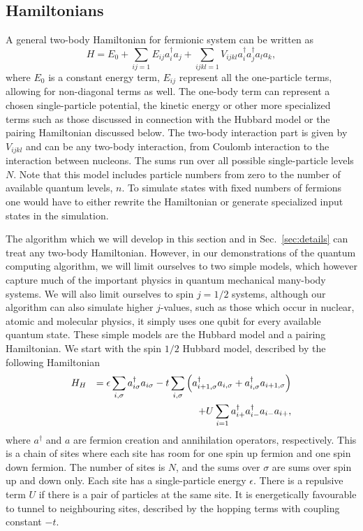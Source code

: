 \subsection{Hamiltonians}
A general two-body Hamiltonian for fermionic system 
can be written as 
\begin{equation}
\label{eq:twobodyH}
H = E_0 + \sum_{ij=1} E_{ij} a^\dag_i a_j
+\sum_{ijkl = 1} V_{ijkl} a^\dag_i a^\dag_j a_l a_k,
\end{equation} 
where $E_0$ is a constant energy term, $E_{ij}$ represent all the
one-particle terms, allowing for non-diagonal terms as well. The
one-body term can represent 
a chosen single-particle potential, the kinetic energy or other more
specialized terms such as  
those discussed in connection with the Hubbard model
\cite{hubbardmodel} or the pairing Hamiltonian  
discussed below.
The two-body interaction part is given by $V_{ijkl}$ and can be any
two-body interaction, from 
Coulomb interaction to the interaction between nucleons.  
The sums run over all possible single-particle levels $N$. 
Note that
this model includes particle numbers from zero to the number of
available quantum levels, $n$. To simulate states with fixed numbers
of fermions one would have to either rewrite the Hamiltonian or
generate specialized input states in the simulation.

The algorithm which we will develop in this section and in
Sec.~\ref{sec:details} can treat any 
two-body Hamiltonian. However, 
in our demonstrations of the quantum computing algorithm, we will limit ourselves to
two simple models, which however capture much of the important physics
in quantum mechanical 
many-body systems. We will also limit ourselves to spin $j=1/2$
systems, although our algorithm 
can also simulate  higher $j$-values, such as those which occur in nuclear, atomic and
molecular physics, it simply uses one qubit for every available
quantum state.   
These simple models are the Hubbard model and a pairing
Hamiltonian.
We start with the spin $1/2$ Hubbard model, described by the following Hamiltonian
\begin{eqnarray}
H_H &&= \epsilon \sum_{i, \sigma} a_{i\sigma}^\dag a_{i\sigma} 
-t \sum_{i, \sigma} \left(a^\dag_{i+1, \sigma}a_{i, \sigma}
+a^\dag_{i, \sigma}a_{i+1, \sigma} \right) \notag \\
&& + U \sum_{i=1} a_{i+}^\dag a_{i-}^\dag a_{i-}a_{i+},
\label{eq:hubbard}
\end{eqnarray}
where $a^{\dagger}$ and $a$ are fermion creation and annihilation operators, respectively.
This is a chain of sites where each site has room for one spin up
fermion and one spin down fermion. 
The number of sites is $N$, and the sums over $\sigma$ are sums over
spin up and down only.
Each site has a single-particle
energy $\epsilon$. There is a repulsive term $U$ if there is a pair
of particles at the same site. It is energetically favourable to tunnel to
neighbouring sites, described by 
the hopping terms with coupling constant $-t$.

